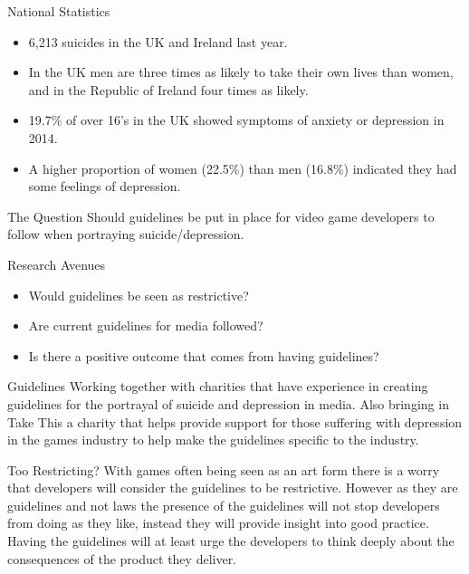 \documentclass{beamer}
\begin{document}
\begin{frame}{National Statistics}
		\begin{itemize}
		\item 6,213 suicides in the UK and Ireland last year\cite{death2018suicide}.
		\item In the UK men are three times as likely to take their own lives than women, and in the Republic of Ireland four times as likely\cite{death2018suicide}.
		\item 19.7\% of over 16's in the UK showed symptoms of anxiety or depression in 2014\cite{MentalStatistics}.
		\item A higher proportion of women (22.5\%) than men (16.8\%) indicated they had some feelings of depression\cite{MentalStatistics}.
	\end{itemize}
\end{frame}

\begin{frame}{The Question}
	Should guidelines be put in place for video game developers to follow when portraying suicide/depression.
\end{frame}

\begin{frame}{Research Avenues}
	\begin{itemize}
		\item Would guidelines be seen as restrictive?
		\item Are current guidelines for media followed?
		\item Is there a positive outcome that comes from having guidelines?
	\end{itemize}
\end{frame}

\begin{frame}{Guidelines}
	Working together with charities that have experience in creating guidelines for the portrayal of suicide and depression in media\cite{world2017preventing}\cite{nepon2009media}. Also bringing in Take This\cite{TakeThis} a charity that helps provide support for those suffering with depression in the games industry to help make the guidelines specific to the industry.
\end{frame}

\begin{frame}{Too Restricting?}
	With games often being seen as an art form\cite{pearce2006games} there is a worry that developers will consider the guidelines to be restrictive. However as they are guidelines and not laws the presence of the guidelines will not stop developers from doing as they like, instead they will provide insight into good practice. Having the guidelines will at least urge the developers to think deeply about the consequences of the product they deliver.
\end{frame}
\end{document}
